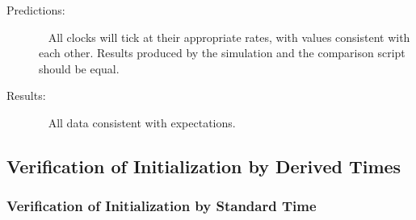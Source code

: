 \begin{description}
\item[Predictions:]\ \newline
All clocks will tick at their appropriate rates, with values consistent with each other. Results produced by the simulation and the comparison script should be equal.

\item[Results:]\ \newline
All data consistent with expectations.

\end{description}


\subsection{Verification of Initialization by Derived Times}


\subsubsection{Verification of Initialization by Standard Time}


